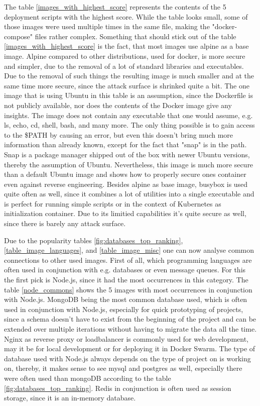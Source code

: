 The table \ref{images_with_highest_score} represents the contents of the 5 deployment scripts with the highest score. While the table looks small, some of those images were used multiple times in the same file, making the "docker-compose" files rather complex.
Something that should stick out of the table \ref{images_with_highest_score} is the fact, that most images use alpine as a base image. Alpine compared to other distributions, used for docker, is more secure and simpler, due to the removal of a lot of standard libraries and executables. Due to the removal of such things the resulting image is much smaller and at the same time more secure, since the attack surface is shrinked quite a bit.
The one image that is using Ubuntu in this table is an assumption, since the Dockerfile is not publicly available, nor does the contents of the Docker image give any insights. The image does not contain any executable that one would assume, e.g. ls, echo, cd, shell, bash, and many more. The only thing possible is to gain access to the \$PATH by causing an error, but even this doesn't bring much more information than already known, except for the fact that "snap" is in the path. Snap is a package manager shipped out of the box with newer Ubuntu versions, thereby the assumption of Ubuntu. Nevertheless, this image is much more secure than a default Ubuntu image and shows how to properly secure ones container even against reverse engineering.
Besides alpine as base image, busybox is used quite often as well, since it combines a lot of utilities into a single executable and is perfect for running simple scripts or in the context of Kubernetes as initialization container. Due to its limitied capabilities it's quite secure as well, since there is barely any attack surface.

Due to the popularity tables \ref{fig:databases_top_ranking}, \ref{table_image_languages}, and \ref{table_image_misc} one can now analyse common connections to other used images. First of all, which programming languages are often used in conjunction with e.g. databases or even message queues.
For this the first pick is Node.js, since it had the most occurrences in this category. The table \ref{node_commons} shows the 5 images with most occurrences in conjunction with Node.js. MongoDB being the most common database used, which is often used in conjunction with Node.js, especially for quick prototyping of projects, since a schema doesn't have to exist from the beginning of the project and can be extended over multiple iterations without having to migrate the data all the time. Nginx as reverse proxy or loadbalancer is commonly used for web development, may it be for local development or for deploying it in Docker Swarm. The type of database used with Node.js always depends on the type of project on is working on, thereby, it makes sense to see mysql and postgres as well, especially there were often used than mongoDB according to the table \ref{fig:databases_top_ranking}. Redis in conjunction is often used as session storage, since it is an in-memory database.

